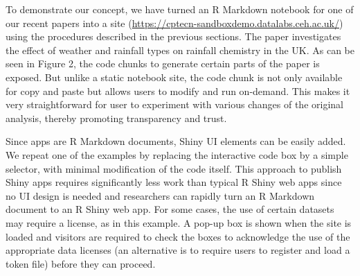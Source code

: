 To demonstrate our concept, we have turned an R Markdown notebook for
one of our recent papers \citep{Tso2022} into a  site
(\url{https://cptecn-sandboxdemo.datalabs.ceh.ac.uk/}) using the
procedures described in the previous sections. The paper investigates
the effect of weather and rainfall types on rainfall chemistry in the
UK. As can be seen in Figure 2, the code chunks to generate certain
parts of the paper is exposed. But unlike a static notebook site, the
code chunk is not only available for copy and paste but allows users to
modify and run on-demand. This makes it very straightforward for user to
experiment with various changes of the original analysis, thereby
promoting transparency and trust.

Since  apps are R Markdown documents, Shiny UI elements can
be easily added. We repeat one of the examples by replacing the
interactive code box by a simple selector, with minimal modification of
the code itself. This approach to publish Shiny apps requires
significantly less work than typical R Shiny web apps since no UI design
is needed and researchers can rapidly turn an R Markdown document to an
R Shiny web app. For some cases, the use of certain datasets may require
a license, as in this example. A pop-up box is shown when the site is
loaded and visitors are required to check the boxes to acknowledge the
use of the appropriate data licenses (an alternative is to require users
to register and load a token file) before they can proceed.

